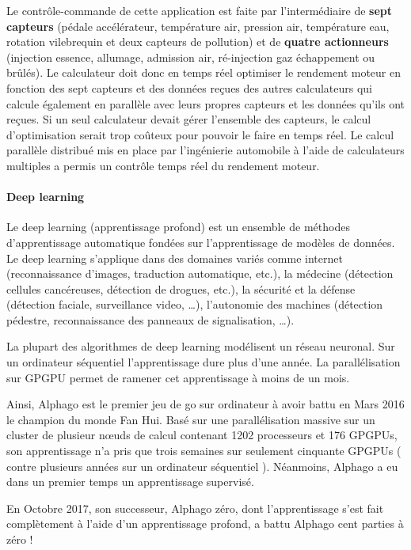 \documentclass[fleqn,11pt]{article}
\begin{document}
Le contrôle-commande de cette application est faite par l'intermédiaire de \textbf{sept capteurs} (pédale accélérateur,  température air, pression air, température eau, rotation vilebrequin et deux capteurs de pollution) et de \textbf{quatre actionneurs} (injection essence, allumage, admission air, ré-injection gaz échappement ou brûlés). Le calculateur doit donc en temps réel optimiser le rendement moteur en fonction des sept capteurs et des données reçues des autres calculateurs qui calcule également en parallèle avec leurs propres capteurs et les données qu'ils ont reçues. Si un seul calculateur devait gérer l'ensemble des capteurs, le calcul d'optimisation serait trop coûteux pour pouvoir le faire en temps réel. Le calcul parallèle distribué mis en place par l'ingénierie automobile à l'aide de calculateurs multiples a permis un contrôle temps réel du rendement moteur. 

\paragraph{Deep learning}

Le deep learning (apprentissage profond) est un ensemble de méthodes d'apprentissage automatique fondées sur l'apprentissage de modèles de données. Le deep learning s'applique dans des domaines variés  comme internet (reconnaissance d'images, traduction automatique, etc.), la médecine  (détection cellules cancéreuses, détection de drogues, etc.), la sécurité et la défense  (détection faciale, surveillance video, \ldots), l'autonomie des machines (détection pédestre,  reconnaissance des panneaux de signalisation, \ldots).

La plupart des algorithmes de deep learning modélisent un réseau neuronal. Sur un ordinateur séquentiel l'apprentissage dure plus d'une année. La parallélisation sur GPGPU permet de ramener cet apprentissage  à moins de un mois.

Ainsi, Alphago est le premier jeu de go sur ordinateur à avoir battu en Mars 2016 le champion du monde Fan Hui. Basé sur une parallélisation massive sur un cluster de plusieur nœuds de calcul contenant 1202 processeurs et 176 GPGPUs, son apprentissage n'a pris que trois semaines sur seulement cinquante GPGPUs ( contre plusieurs années sur un ordinateur séquentiel ). Néanmoins, Alphago a eu dans un premier temps un apprentissage supervisé.

En Octobre 2017, son successeur, Alphago zéro, dont l'apprentissage s'est fait complètement à l'aide d'un apprentissage profond,
a battu Alphago cent parties à zéro !
\end{document}
